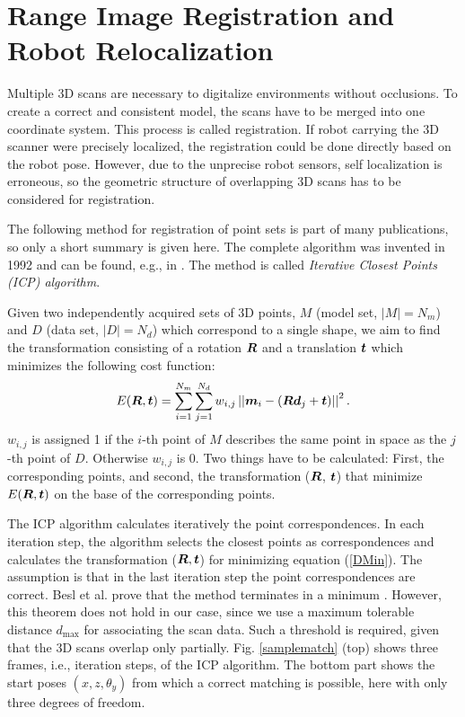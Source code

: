 \documentclass[12pt,dvips]{article}
\renewcommand{\v}[1]{\text{\boldmath $#1$}}
\newcommand{\V}[1]{\text{\boldmath $#1$}}
\newcommand{\M}[1]{\v{#1}}                     %
\newcommand{\norm}[1]{\left | \left | #1 \right | \right |}
\begin{document}
{\newpage
\setcounter{page}{1}

\section{Range Image Registration and Robot Relocalization}

Multiple 3D scans are necessary to digitalize environments
without occlusions. To create a correct and consistent model, the
scans have to be merged into one coordinate system. This process
is called registration. If robot carrying the 3D scanner were
precisely localized, the registration could be done directly
based on the robot pose. However, due to the unprecise robot
sensors, self localization is erroneous, so the geometric
structure of overlapping 3D scans has to be considered for
registration.

The following method for registration of point sets is part of
many publications, so only a short summary is given here. The
complete algorithm was invented in 1992 and can be found, e.g.,
in \cite{Besl_1992}. The method is called \emph{Iterative Closest
Points (ICP) algorithm}.

Given two independently acquired sets of 3D points, $M$ (model
set, $|M| = N_m$) and $D$ (data set, $|D| = N_d$) which
correspond to a single shape, we aim to find the transformation
consisting of a rotation $\M R$ and a translation $\V t$ which
minimizes the following cost function:
\begin{equation}\label{DMin}
E(\M R, \V t) =
\sum_{i=1}^{N_m}\sum_{j=1}^{N_d}w_{i,j}\norm{\V m_{i}-(\M R
\V d_j+\V t)}^2.
\end{equation}
$w_{i,j}$ is assigned 1 if the $i$-th point of $M$ describes the
same point in space as the $j$-th point of $D$. Otherwise
$w_{i,j}$ is 0. Two things have to be calculated: First, the
corresponding points, and second, the transformation ($\M R$,
$\V t$) that minimize $E(\M R, \V t)$ on the base of the
corresponding points.

The ICP algorithm calculates iteratively the point
correspondences. In each iteration step, the algorithm selects
the closest points as correspondences and calculates the
transformation ($\M R, \V t$) for minimizing equation
(\ref{DMin}). The assumption is that in the last iteration step
the point correspondences are correct.  Besl et al. prove that
the method terminates in a minimum \cite{Besl_1992}. However,
this theorem does not hold in our case, since we use a maximum
tolerable distance $d_\text{max}$ for associating the scan
data. Such a threshold is required, given that the 3D scans
overlap only partially. Fig. \ref{samplematch} (top) shows three
frames, i.e., iteration steps, of the ICP algorithm. The bottom
part shows the start poses $(x,z,\theta_y)$ from which a correct
matching is possible, here with only three degrees of freedom.

}
\end{document}
